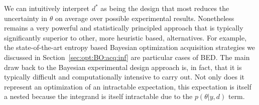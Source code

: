 We can intuitively interpret $d^*$ as being the design that most reduces the uncertainty in $\theta$
on average over possible experimental results.  Nonetheless \Bad remains a very powerful and
statistically principled approach that is typically significantly superior to other, more heuristic based,
alternatives.  For example, the state-of-the-art entropy based Bayesian optimization acquisition strategies we 
discussed in Section~\ref{sec:opt:BO:acq:inf} are particular cases of BED.
The main draw back to the Bayesian experimental design 
approach is, in fact, that it is typically difficult and computationally intensive to carry out.  
Not only does it represent an optimization 
of an intractable expectation, this expectation is itself a nested because
the integrand is itself intractable due to the $p\left(\theta | y, d\right)$ term.